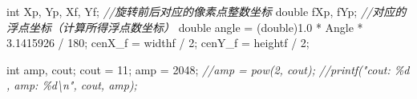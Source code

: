 \documentclass[
]{article}
\newenvironment{Shaded}{}{}
\newcommand{\CommentTok}[1]{\textcolor[rgb]{0.38,0.63,0.69}{\textit{#1}}}
\newcommand{\DataTypeTok}[1]{\textcolor[rgb]{0.56,0.13,0.00}{#1}}
\newcommand{\DecValTok}[1]{\textcolor[rgb]{0.25,0.63,0.44}{#1}}
\newcommand{\FloatTok}[1]{\textcolor[rgb]{0.25,0.63,0.44}{#1}}
\newcommand{\NormalTok}[1]{#1}
\newcommand{\OperatorTok}[1]{\textcolor[rgb]{0.40,0.40,0.40}{#1}}
\begin{document}
\begin{Shaded}
\begin{Highlighting}[]
    \DataTypeTok{int}\NormalTok{     Xp}\OperatorTok{,}\NormalTok{ Yp}\OperatorTok{,}\NormalTok{ Xf}\OperatorTok{,}\NormalTok{ Yf}\OperatorTok{;}                 \CommentTok{//旋转前后对应的像素点整数坐标}
    \DataTypeTok{double}\NormalTok{  fXp}\OperatorTok{,}\NormalTok{ fYp}\OperatorTok{;}                       \CommentTok{//对应的浮点坐标（计算所得浮点数坐标）}
    \DataTypeTok{double}\NormalTok{  angle }\OperatorTok{=} \OperatorTok{(}\DataTypeTok{double}\OperatorTok{)}\FloatTok{1.0} \OperatorTok{*}\NormalTok{ Angle }\OperatorTok{*} \FloatTok{3.1415926} \OperatorTok{/} \DecValTok{180}\OperatorTok{;}
\NormalTok{    cenX\_f }\OperatorTok{=}\NormalTok{ widthf }\OperatorTok{/} \DecValTok{2}\OperatorTok{;}
\NormalTok{    cenY\_f }\OperatorTok{=}\NormalTok{ heightf }\OperatorTok{/} \DecValTok{2}\OperatorTok{;}

    \DataTypeTok{int}\NormalTok{ amp}\OperatorTok{,}\NormalTok{ cout}\OperatorTok{;}
\NormalTok{    cout   }\OperatorTok{=} \DecValTok{11}\OperatorTok{;}
\NormalTok{    amp    }\OperatorTok{=} \DecValTok{2048}\OperatorTok{;}
    \CommentTok{//amp    = pow(2, cout);}
    \CommentTok{//printf("cout: \%d , amp: \%d\textbackslash{}n", cout, amp);}


\end{Highlighting}
\end{Shaded}
\end{document}
